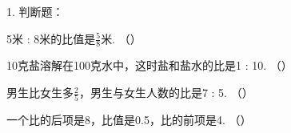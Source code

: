 1. 判断题： \\

\begin{subquestions}

    \subquestion 5米 : 8米的比值是$\frac{5}{8}$米.  \hfill （\quad）

    \subquestion 10克盐溶解在100克水中，这时盐和盐水的比是1 : 10.   \hfill （\quad）

    \subquestion 男生比女生多$\frac{2}{5}$，男生与女生人数的比是7 : 5.   \hfill （\quad）

    \subquestion 一个比的后项是8，比值是0.5，比的前项是4.   \hfill （\quad）

\end{subquestions}






